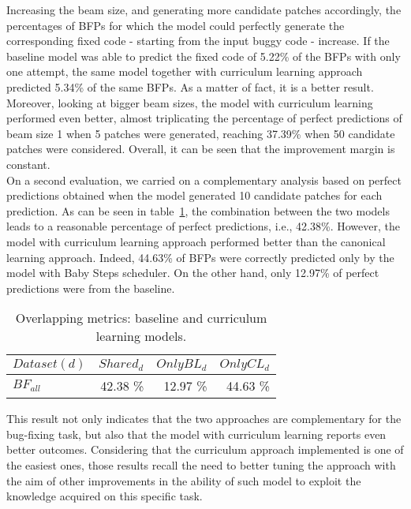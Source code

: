 Increasing the beam size, and generating more candidate patches accordingly,
the percentages of BFPs for which the model could perfectly generate the corresponding
fixed code - starting from the input buggy code - increase. If the baseline model was able to predict
the fixed code of 5.22\% of the BFPs with only one attempt, the same model together with 
curriculum learning approach predicted 5.34\% of the same BFPs. As a matter of fact, it is a 
better result. Moreover, looking at bigger beam sizes, the model with curriculum learning performed 
even better, almost triplicating the percentage of perfect predictions of beam size 1 when 5 patches were generated,
reaching 37.39\% when 50 candidate patches were considered. Overall, it can be seen that
the improvement margin is constant.\\
On a second evaluation, we carried on a complementary analysis based on perfect predictions
obtained when the model generated 10 candidate patches for each prediction. 
As can be seen 
in table~\ref{table:pp_bugfixing_overlap}, the combination between the two models 
leads to a reasonable percentage of perfect predictions, i.e., 42.38\%. However, the model 
with curriculum learning approach performed better than the canonical learning approach. Indeed, 44.63\% of BFPs were correctly predicted
only by the model with Baby Steps scheduler. On the other hand, only 12.97\% of perfect predictions were from the baseline.
\begin{table}[h!]
    \centering
    \begin{tabular}{l|r|r|r}
    \(Dataset (d)\) & \(Shared_d\) & \(OnlyBL_d\) & \(OnlyCL_d\)\\ [0.5ex]
    \hline 
    \(BF_{all}\) & 42.38 \% & 12.97 \% & 44.63 \%\\  [1ex]
    \end{tabular}
    \caption{Overlapping metrics: baseline and curriculum learning models.}
    \label{table:pp_bugfixing_overlap}
\end{table}
This result not only indicates that the two approaches are complementary for
the bug-fixing task, but also that the model with curriculum learning reports even 
better outcomes. Considering that the curriculum approach implemented is one of the easiest ones,
those results recall the need to better tuning the approach with the aim of 
other improvements in the ability of such model to exploit the knowledge acquired on 
this specific task. 

